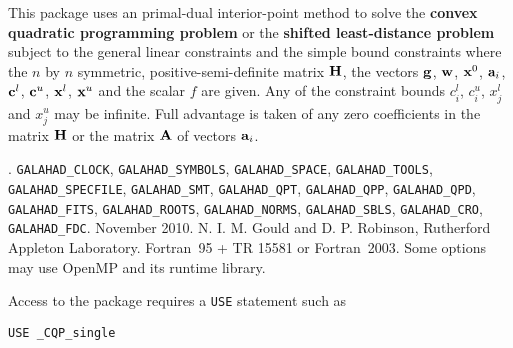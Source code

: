 \documentclass{galahad}
\newcommand{\packagename}{CQP}
\newcommand{\fullpackagename}{\libraryname\_\packagename}
\begin{document}
\galheader


\galsummary
This package uses an primal-dual interior-point method
to solve the {\bf convex quadratic programming problem}
or the {\bf shifted least-distance problem}
subject to the general linear constraints
and the simple bound constraints
where the $n$ by $n$ symmetric, positive-semi-definite matrix ${\mathbf{H}}$, the
vectors ${\mathbf{g}}$, ${\mathbf{w}}$, ${\mathbf{x}}^{0}$,
${\mathbf{a}}_{i}$, ${\mathbf{c}}^{l}$, ${\mathbf{c}}^{u}$, ${\mathbf{x}}^{l}$,
${\mathbf{x}}^{u}$ and the scalar $f$ are given.
Any of the constraint bounds $c_{i}^{l}$, $c_{i}^{u}$,
$x_{j}^{l}$ and $x_{j}^{u}$ may be infinite.
Full advantage is taken of any zero coefficients in the matrix ${\mathbf{H}}$
or the matrix ${\mathbf{A}}$ of vectors ${\mathbf{a}}_{i}$.


\galattributes
\galversions{\tt  \fullpackagename\_single, \fullpackagename\_double}.
\galuses
{\tt GALAHAD\_CLOCK},
{\tt GALAHAD\_SY\-M\-BOLS},
{\tt GALAHAD\-\_SPACE},
{\tt GALAHAD\_TOOLS},
{\tt GALAHAD\_SPECFILE},
{\tt GALAHAD\_SMT},
{\tt GALAHAD\_QPT},
{\tt GALAHAD\_QPP},
{\tt GALAHAD\_\-QPD},
{\tt GALAHAD\_\-FITS},
{\tt GALAHAD\_\-ROOTS},
{\tt GALAHAD\_\-NORMS},
{\tt GALAHAD\_\-SBLS},
{\tt GALAHAD\_\-CRO},
{\tt GALAHAD\_FDC}.
\galdate November 2010.
\galorigin N. I. M. Gould and D. P. Robinson, Rutherford Appleton Laboratory.
\gallanguage Fortran~95 + TR 15581 or Fortran~2003.
\galparallelism Some options may use OpenMP and its runtime library.


\galhowto


Access to the package requires a {\tt USE} statement such as

\medskip{}

\hspace{8mm} {\tt USE \fullpackagename\_single}
\end{document}
